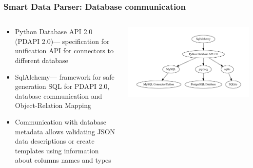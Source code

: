 \documentclass[8pt,pdf,hyperref={unicode}]{beamer}
\begin{document}
\begin{frame}
    \frametitle{Smart Data Parser: Database communication}
	\begin{columns}
	\begin{column}{0.5\linewidth}
		\begin{itemize}
				\item Python Database API 2.0 (PDAPI 2.0)\footnotemark --- specification for unification API for connectors to different database
				\item SqlAlchemy\footnotemark --- framework for safe generation SQL for PDAPI 2.0, database communication and Object-Relation Mapping
				\item Communication with database metadata allows validating JSON data descriptions or create templates using information about columns names and types
				
		\end{itemize}

	\end{column}
	\begin{column}{0.5\linewidth}
		\includegraphics[width=\linewidth]{image/schema_2.dot.pdf}
	\end{column}
	\end{columns} 
\end{frame}
\end{document}
